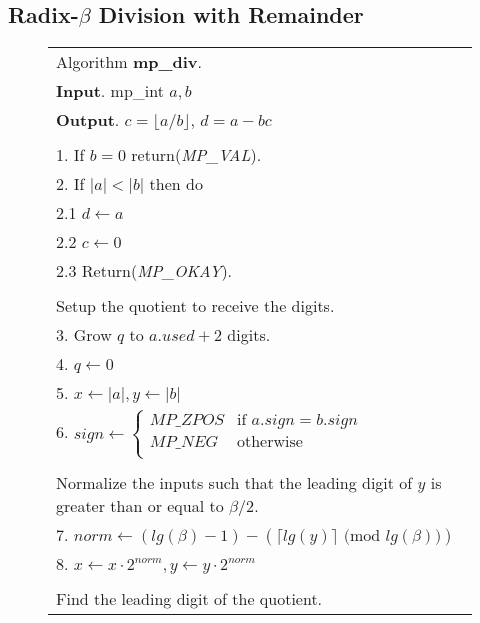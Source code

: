 \documentclass[b5paper]{book}
\begin{document}
\subsection{Radix-$\beta$ Division with Remainder}
\newpage\begin{figure}[!here]
\begin{small}
\begin{center}
\begin{tabular}{l}
\hline Algorithm \textbf{mp\_div}. \\
\textbf{Input}.   mp\_int $a, b$ \\
\textbf{Output}.  $c = \lfloor a/b \rfloor$, $d = a - bc$ \\
\hline \\
1.  If $b = 0$ return(\textit{MP\_VAL}). \\
2.  If $\vert a \vert < \vert b \vert$ then do \\
\hspace{3mm}2.1  $d \leftarrow a$ \\
\hspace{3mm}2.2  $c \leftarrow 0$ \\
\hspace{3mm}2.3  Return(\textit{MP\_OKAY}). \\
\\
Setup the quotient to receive the digits. \\
3.  Grow $q$ to $a.used + 2$ digits. \\
4.  $q \leftarrow 0$ \\
5.  $x \leftarrow \vert a \vert , y \leftarrow \vert b \vert$ \\
6.  $sign \leftarrow  \left \lbrace \begin{array}{ll}
                              MP\_ZPOS &  \mbox{if }a.sign = b.sign \\
                              MP\_NEG  &  \mbox{otherwise} \\
                              \end{array} \right .$ \\
\\
Normalize the inputs such that the leading digit of $y$ is greater than or equal to $\beta / 2$. \\
7.  $norm \leftarrow (lg(\beta) - 1) - (\lceil lg(y) \rceil \mbox{ (mod }lg(\beta)\mbox{)})$ \\
8.  $x \leftarrow x \cdot 2^{norm}, y \leftarrow y \cdot 2^{norm}$ \\
\\
Find the leading digit of the quotient. \\

\end{tabular}
\end{center}
\end{small}
\end{figure}
\end{document}
